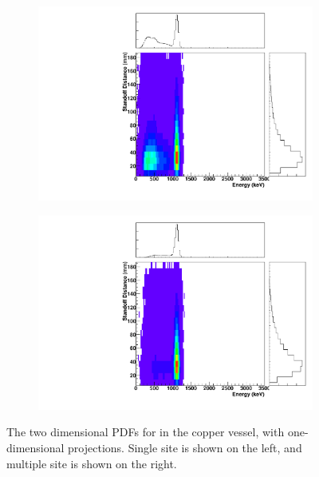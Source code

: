 \documentclass[herrin-thesis.tex]{subfiles}
\begin{document}
\begin{figure}[hp]
\centering
	\begin{subfigure}[b]{0.48\textwidth}
	\centering
	\includegraphics[width=\textwidth]{./plots/PDFs/analysis_pdf_AllVessel_Zn65_ss.pdf}
\end{subfigure}\hfill%
\begin{subfigure}[b]{0.48\textwidth}
	\centering
	\includegraphics[width=1\textwidth]{./plots/PDFs/analysis_pdf_AllVessel_Zn65_ms.pdf}
	\end{subfigure}
\caption[PDF for  in the TPC vessel]{The two dimensional PDFs for  in the copper vessel, with one-dimensional projections. Single site is shown on the left, and multiple site is shown on the right.}
\label{fig:analysis_pdf_AllVessel_Zn65}
\end{figure}
\end{document}

